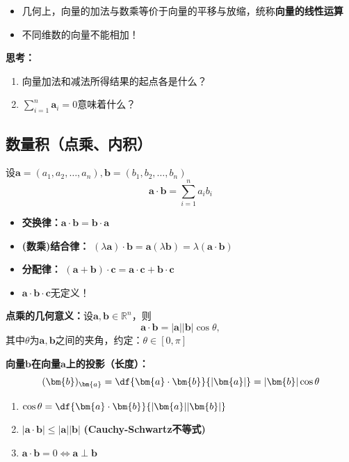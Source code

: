 \begin{itemize}
  \item 几何上，向量的加法与数乘等价于向量的平移与放缩，统称{\bf 向量的线性运算}
  \item 不同维数的向量不能相加！
\end{itemize}

{\bf 思考：}
\begin{enumerate}[(1)]
  \setlength{\itemindent}{1cm}
  \item 向量加法和减法所得结果的起点各是什么？
  \item $\sum\limits_{i=1}^n\bm{a}_i=0$意味着什么？
\end{enumerate}

\subsection{数量积（点乘、内积）}

设$\bm{a}=(a_1,a_2,\ldots,a_n),\bm{b}=(b_1,b_2,\ldots,b_n)$
$$\bm{a}\cdot\bm{b}=\sum\limits_{i=1}^na_ib_i$$

\begin{itemize}
  \item {\bf 交换律：}$\bm{a}\cdot\bm{b}=\bm{b}\cdot\bm{a}$ 
  \item {\bf (数乘)结合律：}
  $(\lambda\bm{a})\cdot\bm{b}=\bm{a}(\lambda\bm{b})
  =\lambda(\bm{a}\cdot\bm{b})$  
  \item {\bf 分配律：}  $(\bm{a}+\bm{b})\cdot\bm{c}=\bm{a}\cdot
  \bm{c}+\bm{b}\cdot\bm{c}$ 
  \item $\bm{a}\cdot\bm{b}\cdot\bm{c}$无定义！
\end{itemize}

{\bf 点乘的几何意义：}设$\bm{a},\bm{b}\in\mathbb{R}^n$，则
$$\bm{a}\cdot\bm{b}=|\bm{a}||\bm{b}|\cos\theta,$$
其中$\theta$为$\bm{a},\bm{b}$之间的夹角，约定：$\theta\in[0,\pi]$

{\bf 向量$\bm{b}$在向量$\bm{a}$上的投影（长度）：}
$$(\bm{b})_{\bm{a}}=\df{\bm{a}\cdot\bm{b}}{|\bm{a}|}
=|\bm{b}|\cos\theta$$

\begin{enumerate}[(1)]
  \setlength{\itemindent}{1cm}
  \item $\cos\theta=\df{\bm{a}\cdot\bm{b}}{|\bm{a}||\bm{b}|}$
  \item $|\bm{a}\cdot\bm{b}|\leq|\bm{a}||\bm{b}|$
  \hfill{\bf (Cauchy-Schwartz不等式)}
  \item $\bm{a}\cdot\bm{b}=0\Leftrightarrow\bm{a}\perp\bm{b}$
\end{enumerate}

